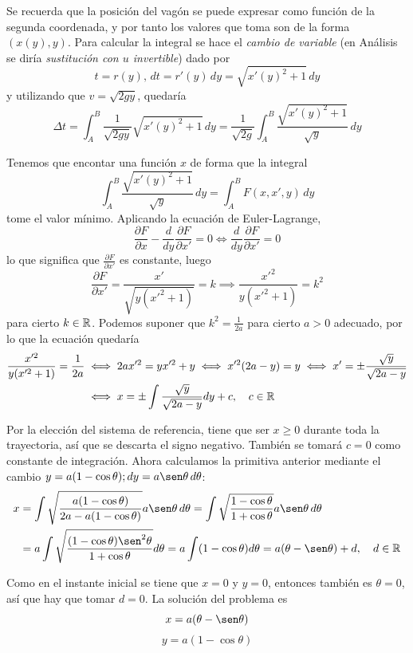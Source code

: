 \documentclass[12pt]{report}
\begin{document}
\begin{example}[Braquistócrona]
\vspace{2mm}
Se recuerda que la posición del vagón se puede expresar como función de la segunda coordenada, y por tanto los valores que toma son de la forma $(x(y),y)$. Para calcular la integral se hace el \textit{cambio de variable} (en Análisis se diría \textit{sustitución con $u$ invertible}) dado por \[t = r(y), \, dt = r'(y) \, dy = \sqrt{x'(y)^2+1} \, dy\] 
y utilizando que $v = \sqrt{2gy}$, quedaría
\[\Delta t = \int_A^B \frac{1}{\sqrt{2gy}}\sqrt{x'(y)^2+1} \, dy = \frac{1}{\sqrt{2g}} \int_A^B \frac{\sqrt{x'(y)^2+1}}{\sqrt{y}} \, dy\]

\noindent Tenemos que encontar una función $x$ de forma que la integral 
\[\int_A^B \frac{\sqrt{x'(y)^2+1}}{\sqrt{y}} \, dy = \int_A^B F(x,x',y) \, dy\]
tome el valor mínimo. Aplicando la ecuación de Euler-Lagrange,
\[\frac{\partial F}{\partial x} - \frac{d}{dy} \frac{\partial F}{\partial x'} = 0 \iff \frac{d}{dy}\frac{\partial F}{\partial x'} = 0\]
lo que significa que $\frac{\partial F}{\partial x'}$ es constante, luego
\[\frac{\partial F}{\partial x'} = \frac{x'}{\sqrt{y(x'^2+1)}} = k \implies \frac{x'^2}{y(x'^2+1)} = k^2\]
para cierto $k \in \mathbb R$. Podemos suponer que $k^2 = \frac{1}{2a}$ para cierto $a > 0$ adecuado, por lo que la ecuación quedaría
\[
\begin{aligned}[t]
\frac{x'^2}{y(x'^2+1)} = \frac{1}{2a} &\iff 2ax'^2 = yx'^2+y \iff x'^2(2a-y) = y \iff x' = \pm \frac{\sqrt{y}}{\sqrt{2a-y}} \\
&\iff x = \pm \int \frac{\sqrt{y}}{\sqrt{2a-y}}dy + c, \quad c \in \mathbb R
\end{aligned}
\]

Por la elección del sistema de referencia, tiene que ser $x \geq 0$ durante toda la trayectoria, así que se descarta el signo negativo. También se tomará $c = 0$ como constante de integración. Ahora calculamos la primitiva anterior mediante el cambio $y = a(1-\cos \theta); dy = a\sen\theta \, d\theta$:
\[
\begin{aligned}[t]
x &= \int \sqrt{\frac{a(1-\cos\theta)}{2a-a(1-\cos\theta)}}a\sen\theta \, d\theta = \int \sqrt{\frac{1-\cos\theta}{1+\cos\theta}}a\sen\theta \, d\theta \\
&= a \int \sqrt{\frac{(1-\cos\theta)\sen^2\theta}{1+\cos\theta}}d\theta = a \int(1-\cos\theta)d\theta = a(\theta - \sen\theta) + d, \quad d \in \R
\end{aligned}
\]

Como en el instante inicial se tiene que $x = 0$ y $y = 0$, entonces también es $\theta = 0$, así que hay que tomar $d = 0$. La solución del problema es 
\[x = a(\theta-\sen\theta)\]
\[y = a(1-\cos\theta)\]
\end{example}
\end{document}
